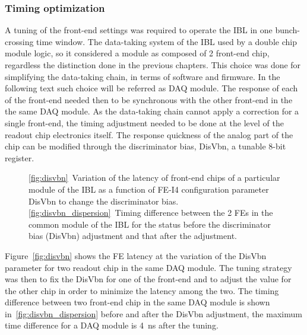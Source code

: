 \subsubsection{Timing optimization}
A tuning of the front-end settings was required to operate the IBL in one bunch-crossing time window.
The data-taking system of the IBL used by a double chip module logic, so it considered a module as composed of 2 front-end chip, regardless the distinction done in the previous chapters. This choice was done for simplifying the data-taking chain, in terms of software and firmware. In the following text such choice will be referred as DAQ module.
The response of each of the front-end needed then to be synchronous with the other front-end in the the same DAQ module. As the data-taking chain cannot apply a correction for a single front-end, the timing adjustment needed to be done at the level of the readout chip electronics itself.
The response quickness of the analog part of the chip can be modified through the discriminator bias, DisVbn, a tunable 8-bit register.
\begin{figure}
\centering
{}
\caption{\ref{fig:disvbn}~Variation of the latency of front-end chips of a particular module of the IBL as a function of FE-I4 configuration parameter DisVbn to change the discriminator bias.\ref{fig:disvbn_dispersion}~Timing difference between the 2 FEs in the common module of the IBL for the status before the discriminator bias (DisVbn) adjustment and that after the adjustment.}
\end{figure}
Figure~\ref{fig:disvbn} shows the FE latency at the variation of the DisVbn parameter for two readout chip in the same DAQ module. The tuning strategy was then to fix the DisVbn for one of the front-end and to adjust the value for the other chip in order to minimize the latency among the two. The timing difference between two front-end chip in the same DAQ module is shown in~\ref{fig:disvbn_dispersion} before and after the DisVbn adjustment, the maximum time difference for a DAQ module is \SI{4}{\nano\second} after the tuning.

